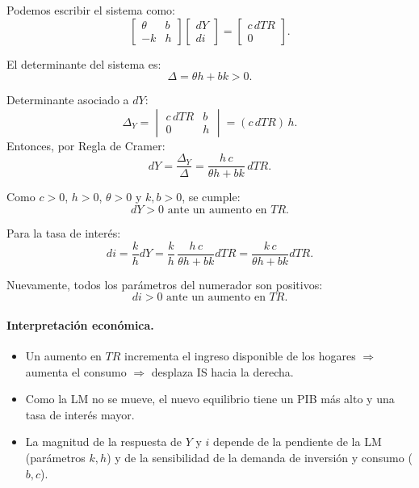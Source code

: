 \documentclass[11pt,addpoints]{article}
\begin{document}
Podemos escribir el sistema como:
\[
\begin{bmatrix}
\theta & b \\
-k     & h
\end{bmatrix}
\begin{bmatrix}
dY \\
di
\end{bmatrix}
=
\begin{bmatrix}
c\,dTR \\
0
\end{bmatrix}.
\]

El determinante del sistema es:
\[
\Delta = \theta h + bk > 0.
\]

Determinante asociado a $dY$:
\[
\Delta_Y = 
\begin{vmatrix}
c\,dTR & b \\
0      & h
\end{vmatrix}
= (c\,dTR)\,h.
\]
\newpage
\vspace*{0.5cm}
Entonces, por Regla de Cramer:
\[
dY = \frac{\Delta_Y}{\Delta} = \frac{h\,c}{\theta h + bk} \, dTR.
\]

Como $c>0$, $h>0$, $\theta>0$ y $k,b>0$, se cumple:
\[
\boxed{dY > 0 \text{ ante un aumento en } TR.}
\]

Para la tasa de interés:
\[
di = \frac{k}{h} dY = \frac{k}{h}\,\frac{h\,c}{\theta h + bk} dTR
= \frac{k\,c}{\theta h + bk} dTR.
\]

Nuevamente, todos los parámetros del numerador son positivos:
\[
\boxed{di > 0 \text{ ante un aumento en } TR.}
\]

\medskip

\paragraph{Interpretación económica.}

\begin{itemize}
  \item Un aumento en $TR$ incrementa el ingreso disponible de los hogares $\Rightarrow$ aumenta el consumo $\Rightarrow$ desplaza IS hacia la derecha.
  \item Como la LM no se mueve, el nuevo equilibrio tiene un PIB más alto y una tasa de interés mayor.
  \item La magnitud de la respuesta de $Y$ y $i$ depende de la pendiente de la LM (parámetros $k,h$) y de la sensibilidad de la demanda de inversión y consumo ($b,c$).
\end{itemize}

\vspace{0.4cm}
\end{document}
